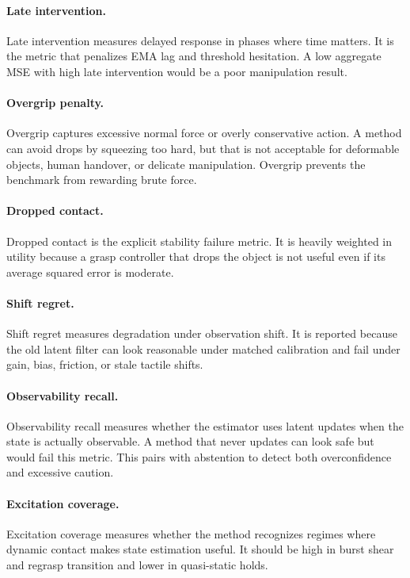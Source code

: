 \documentclass{article}
\begin{document}
\paragraph{Late intervention.}
Late intervention measures delayed response in phases where time matters. It is the metric that penalizes EMA lag and threshold hesitation. A low aggregate MSE with high late intervention would be a poor manipulation result.

\paragraph{Overgrip penalty.}
Overgrip captures excessive normal force or overly conservative action. A method can avoid drops by squeezing too hard, but that is not acceptable for deformable objects, human handover, or delicate manipulation. Overgrip prevents the benchmark from rewarding brute force.

\paragraph{Dropped contact.}
Dropped contact is the explicit stability failure metric. It is heavily weighted in utility because a grasp controller that drops the object is not useful even if its average squared error is moderate.

\paragraph{Shift regret.}
Shift regret measures degradation under observation shift. It is reported because the old latent filter can look reasonable under matched calibration and fail under gain, bias, friction, or stale tactile shifts.

\paragraph{Observability recall.}
Observability recall measures whether the estimator uses latent updates when the state is actually observable. A method that never updates can look safe but would fail this metric. This pairs with abstention to detect both overconfidence and excessive caution.

\paragraph{Excitation coverage.}
Excitation coverage measures whether the method recognizes regimes where dynamic contact makes state estimation useful. It should be high in burst shear and regrasp transition and lower in quasi-static holds.
\end{document}

